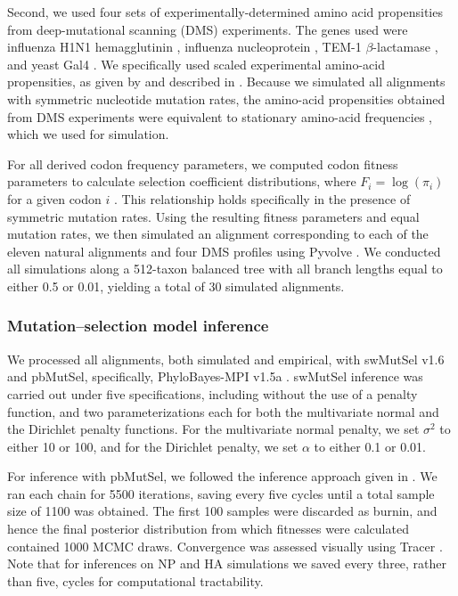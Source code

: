 \documentclass[11pt]{article}
\begin{document}
Second, we used four sets of experimentally-determined amino acid propensities from deep-mutational scanning (DMS) experiments. The genes used were influenza H1N1 hemagglutinin \citep{ThyagarajanBloom2014}, influenza nucleoprotein \citep{Bloom2014a,Doudetal2015}, TEM-1 $\beta$-lactamase \citep{Firnbergetal2014,Stiffleretal2015}, and yeast Gal4 \citep{Kitzmanetal2015}. We specifically used scaled experimental amino-acid propensities, as given by and described in \citet{Bloom2016}. Because we simulated all alignments with symmetric nucleotide mutation rates, the amino-acid propensities obtained from DMS experiments were equivalent to stationary amino-acid frequencies \citep{SellaHirsh2005,Bloom2016}, which we used for simulation.

For all derived codon frequency parameters, we computed codon fitness parameters to calculate selection coefficient distributions, where $F_i= \log({\pi_i})$ for a given codon $i$ \citep{SellaHirsh2005}. This relationship holds specifically in the presence of symmetric mutation rates. Using the resulting fitness parameters and equal mutation rates, we then simulated an alignment corresponding to each of the eleven natural alignments and four DMS profiles using Pyvolve \citep{pyvolve}. We conducted all simulations along a 512-taxon balanced tree with all branch lengths equal to either 0.5 or 0.01, yielding a total of 30 simulated alignments.

\subsubsection*{Mutation--selection model inference}
We processed all alignments, both simulated and empirical, with swMutSel v1.6 \citep{Tamurietal2014} and pbMutSel, specifically, PhyloBayes-MPI v1.5a \citep{RodrigueLartillot2014}. swMutSel inference was carried out under five specifications, including without the use of a penalty function, and two parameterizations each for both the multivariate normal and the Dirichlet penalty functions. For the multivariate normal penalty, we set $\sigma^2$ to either 10 or 100, and for the Dirichlet penalty, we set $\alpha$ to either 0.1 or 0.01.

For inference with pbMutSel, we followed the inference approach given in \citet{Rodrigue2013}. We ran each chain for 5500 iterations, saving every five cycles until a total sample size of 1100 was obtained. The first 100 samples were discarded as burnin, and hence the final posterior distribution from which fitnesses were calculated contained 1000 MCMC draws. Convergence was assessed visually using Tracer \citep{tracer}. Note that for inferences on NP and HA simulations we saved every three, rather than five, cycles for computational tractability.
\end{document}
